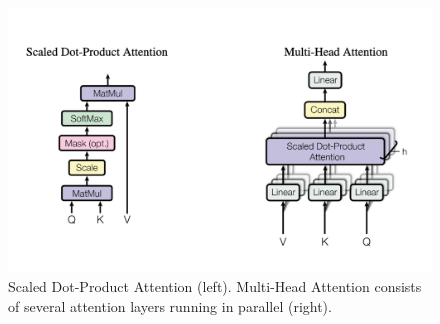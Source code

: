 \begin{figure}[H]
	\centering
	\includegraphics[width=12cm, keepaspectratio]{chapters/1_introduction/imgs/attention.png}
	\caption{Scaled Dot-Product Attention\cite{attention} (left). Multi-Head Attention\cite{attention} consists of several attention layers running in parallel (right).}
	\label{fig:attention}
\end{figure}
%
